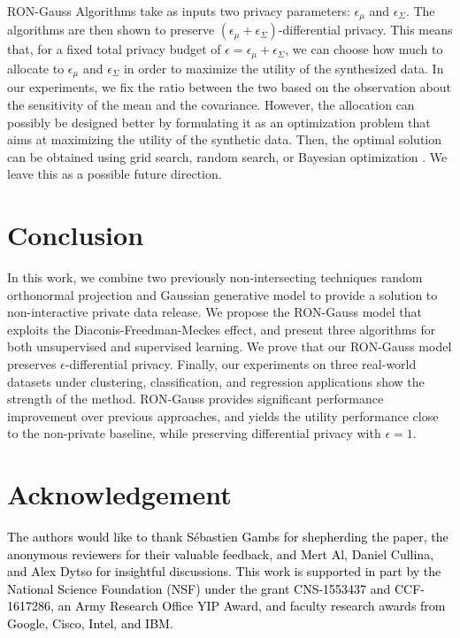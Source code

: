 \documentclass[USenglish,oneside,twocolumn]{article}
\theoremstyle{definition}
\theoremstyle{remark}
\theoremstyle{plain}
\theoremstyle{plain}
\newcommand{\chang}{\textcolor{black}}
\begin{document}
RON-Gauss Algorithms take as inputs two privacy parameters: $\epsilon_{\mu}$ and $\epsilon_{\Sigma}$. The algorithms are then shown to preserve $(\epsilon_{\mu}+\epsilon_{\Sigma})$-differential privacy. This means that, for a fixed total privacy budget of $\epsilon=\epsilon_{\mu}+\epsilon_{\Sigma}$, we can choose how much to allocate to $\epsilon_{\mu}$ and $\epsilon_{\Sigma}$ in order to maximize the utility of the synthesized data. In our experiments, we fix the ratio between the two based on the observation about the sensitivity of the mean and the covariance. However, the allocation can possibly be designed better by formulating it as an optimization problem that aims at maximizing the utility of the synthetic data. Then, the optimal solution can be obtained using grid search, random search, or Bayesian optimization \cite{snoek2012practical}. We leave this as a possible future direction.

\vspace{-1em}
\section{Conclusion}
\vspace{-0.5em}
In this work, we combine two previously non-intersecting techniques
\textendash{} random orthonormal projection and Gaussian generative
model \textendash{} to provide a solution to non-interactive private data release. 
We propose the RON-Gauss model that exploits the Diaconis-Freedman-Meckes effect, and
present three algorithms for both unsupervised and supervised learning. We prove that our RON-Gauss model preserves $\epsilon$-differential
privacy. Finally, our experiments on three real-world datasets under
clustering, classification, and regression applications show the strength
of the method. RON-Gauss provides significant performance
improvement over previous approaches, and yields
the utility performance close to the non-private baseline, while preserving 
differential privacy with $\epsilon=1$.


\section*{Acknowledgement}
\chang{
The authors would like to thank S{\'e}bastien Gambs for shepherding the paper, the anonymous reviewers for their valuable feedback, and Mert Al, Daniel Cullina, and Alex Dytso for  insightful discussions. This work is supported in part by the National Science Foundation (NSF) under the grant CNS-1553437 and CCF-1617286, an Army Research Office YIP Award, and faculty research awards from Google, Cisco, Intel, and IBM.}
\end{document}
